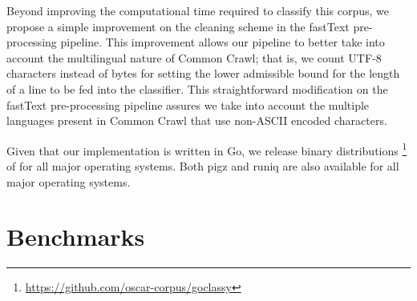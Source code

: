 Beyond improving the computational time required to classify this corpus, we propose a simple improvement on the cleaning scheme in the fastText pre-processing pipeline. This improvement allows our pipeline to better take into account the multilingual nature of Common Crawl; that is, we count UTF-8 characters instead of bytes for setting the lower admissible bound for the length of a line to be fed into the classifier. This straightforward modification on the fastText pre-processing pipeline assures we take into account the multiple languages present in Common Crawl that use non-ASCII encoded characters.

Given that our implementation is written in Go, we release binary distributions \footnote{\url{https://github.com/oscar-corpus/goclassy}} of \goclassy for all major operating systems. Both pigz and runiq are also available for all major operating systems.

\section{Benchmarks}

